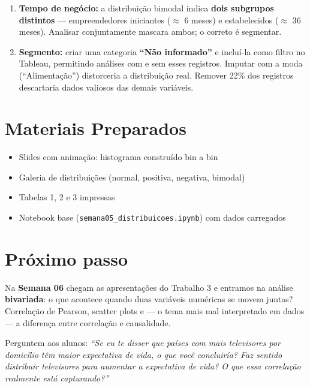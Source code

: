 \begin{SolvedBox}
\begin{enumerate}
  \item \textbf{Tempo de negócio:} a distribuição bimodal indica \textbf{dois subgrupos distintos}
  — empreendedores iniciantes ($\approx$ 6 meses) e estabelecidos ($\approx$ 36 meses).
  Analisar conjuntamente mascara ambos; o correto é segmentar.

  \item \textbf{Segmento:} criar uma categoria \textbf{``Não informado''} e incluí-la
  como filtro no Tableau, permitindo análises com e sem esses registros.
  Imputar com a moda (``Alimentação'') distorceria a distribuição real.
  Remover 22\% dos registros descartaria dados valiosos das demais variáveis.
\end{enumerate}
\end{SolvedBox}

\section{Materiais Preparados}
\begin{itemize}
  \item Slides com animação: histograma construído bin a bin
  \item Galeria de distribuições (normal, positiva, negativa, bimodal)
  \item Tabelas 1, 2 e 3 impressas
  \item Notebook base (\texttt{semana05\_distribuicoes.ipynb}) com dados carregados
\end{itemize}

\section{Próximo passo}

Na \textbf{Semana 06} chegam as apresentações do Trabalho 3 e entramos
na análise \textbf{bivariada}: o que acontece quando duas variáveis numéricas
se movem juntas? Correlação de Pearson, scatter plots e — o tema mais
mal interpretado em dados — a diferença entre correlação e causalidade.

Perguntem aos alunos: \textit{``Se eu te disser que países com mais
televisores por domicílio têm maior expectativa de vida, o que você
concluiría? Faz sentido distribuir televisores para aumentar a expectativa
de vida? O que essa correlação realmente está capturando?''}
